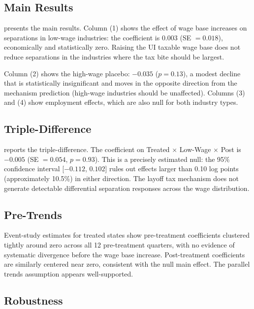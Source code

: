 \documentclass[12pt]{article}
\begin{document}
\subsection{Main Results}



 presents the main results. Column (1) shows the effect of wage base increases on separations in low-wage industries: the coefficient is $0.003$ (SE $= 0.018$), economically and statistically zero. Raising the UI taxable wage base does not reduce separations in the industries where the tax bite should be largest.

Column (2) shows the high-wage placebo: $-0.035$ ($p = 0.13$), a modest decline that is statistically insignificant and moves in the opposite direction from the mechanism prediction (high-wage industries should be unaffected). Columns (3) and (4) show employment effects, which are also null for both industry types.

\subsection{Triple-Difference}



 reports the triple-difference. The coefficient on Treated $\times$ Low-Wage $\times$ Post is $-0.005$ (SE $= 0.054$, $p = 0.93$). This is a precisely estimated null: the 95\% confidence interval [$-0.112$, $0.102$] rules out effects larger than 0.10 log points (approximately 10.5\%) in either direction. The layoff tax mechanism does not generate detectable differential separation responses across the wage distribution.

\subsection{Pre-Trends}

Event-study estimates for treated states show pre-treatment coefficients clustered tightly around zero across all 12 pre-treatment quarters, with no evidence of systematic divergence before the wage base increase. Post-treatment coefficients are similarly centered near zero, consistent with the null main effect. The parallel trends assumption appears well-supported.

\subsection{Robustness}
\end{document}
